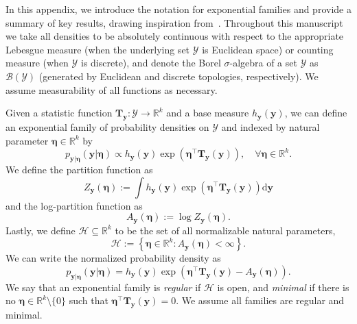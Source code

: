 In this appendix, we introduce the notation for exponential families and provide a summary of key results, drawing inspiration from~\citet[Appendix B]{Johnson2016}. Throughout this manuscript we take all densities to be absolutely continuous with respect to the appropriate Lebesgue measure (when the underlying set $\mathcal{Y}$ is Euclidean space) or counting measure (when $\mathcal{Y}$ is discrete), and denote the Borel $\sigma$-algebra of a set $\mathcal{Y}$ as $\mathcal{B}(\mathcal{Y})$ (generated by Euclidean and discrete topologies, respectively). We assume measurability of all functions as necessary.

Given a statistic function $\mathbf{T}_{\mathbf{y}} : \mathcal{Y} \to \mathbb{R}^k$ and a base measure $h_{\mathbf{y}}(\mathbf{y})$, we can define an exponential family of probability densities on $\mathcal{Y}$ and indexed by natural parameter $\boldsymbol{\eta} \in \mathbb{R}^k$ by
\begin{equation*}
p_{\mathbf{y}\vert \boldsymbol{\eta}}(\mathbf{y} \vert \boldsymbol{\eta}) \propto  h_{\mathbf{y}}(\mathbf{y}) \exp\left( \boldsymbol{\eta}^{\top} \mathbf{T}_{\mathbf{y}}(\mathbf{y})  \right), \quad \forall \boldsymbol{\eta} \in \mathbb{R}^k.
\end{equation*}
 We define the partition function  as
\begin{equation*}
Z_{\mathbf{y}}(\boldsymbol{\eta}) := \int h_{\mathbf{y}}(\mathbf{y}) \exp\left( \boldsymbol{\eta}^{\top} \mathbf{T}_{\mathbf{y}}(\mathbf{y})  \right) \mathrm{d}\mathbf{y}
\end{equation*}
and the log-partition function as
\begin{equation*}
A_{\mathbf{y}}(\boldsymbol{\eta}) := \log Z_{\mathbf{y}}(\boldsymbol{\eta}).
\end{equation*}
Lastly, we define $\mathcal{H} \subseteq \mathbb{R}^k$ to be the set of all normalizable natural parameters,
\begin{equation*}
\mathcal{H} := \left\{ \boldsymbol{\eta} \in \mathbb{R}^k : A_{\mathbf{y}}(\boldsymbol{\eta}) < \infty \right\}.
\end{equation*}
We can write the normalized probability density as
\begin{equation*}
p_{\mathbf{y}\vert \boldsymbol{\eta}}(\mathbf{y} \vert \boldsymbol{\eta}) =h_{\mathbf{y}}(\mathbf{y}) \exp \left(\boldsymbol{\eta}^{\top}\mathbf{T}_{\mathbf{y}}(\mathbf{y}) -A_{\mathbf{y}}(\boldsymbol{\eta}) \right).
\end{equation*}
We say that an exponential family is \emph{regular} if $\mathcal{H}$ is open, and \emph{minimal} if there is no $\boldsymbol{\eta} \in \mathbb{R}^k \setminus \{ 0 \}$ such that $\boldsymbol{\eta}^{\top} \mathbf{T}_{\mathbf{y}}(\mathbf{y}) = 0$. We assume all families are regular and minimal.

